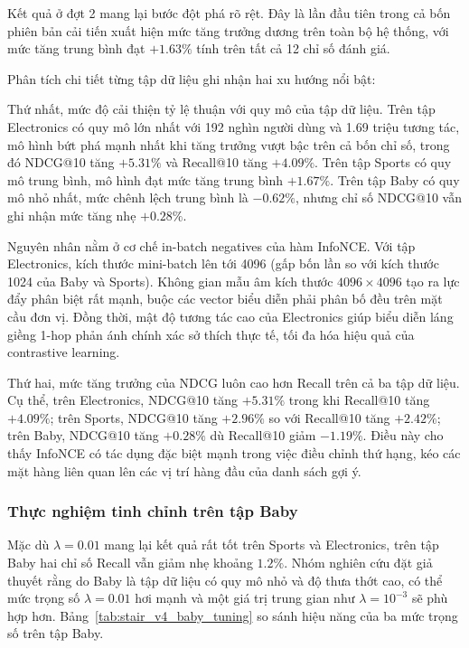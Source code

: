 Kết quả ở đợt 2 mang lại bước đột phá rõ rệt. Đây là lần đầu tiên trong cả bốn phiên bản cải tiến xuất hiện mức tăng trưởng dương trên toàn bộ hệ thống, với mức tăng trung bình đạt $+1.63\%$ tính trên tất cả 12 chỉ số đánh giá.

Phân tích chi tiết từng tập dữ liệu ghi nhận hai xu hướng nổi bật:

Thứ nhất, mức độ cải thiện tỷ lệ thuận với quy mô của tập dữ liệu. Trên tập Electronics có quy mô lớn nhất với 192 nghìn người dùng và 1.69 triệu tương tác, mô hình bứt phá mạnh nhất khi tăng trưởng vượt bậc trên cả bốn chỉ số, trong đó NDCG@10 tăng $+5.31\%$ và Recall@10 tăng $+4.09\%$. Trên tập Sports có quy mô trung bình, mô hình đạt mức tăng trung bình $+1.67\%$. Trên tập Baby có quy mô nhỏ nhất, mức chênh lệch trung bình là $-0.62\%$, nhưng chỉ số NDCG@10 vẫn ghi nhận mức tăng nhẹ $+0.28\%$. 

Nguyên nhân nằm ở cơ chế in-batch negatives của hàm InfoNCE. Với tập Electronics, kích thước mini-batch lên tới 4096 (gấp bốn lần so với kích thước 1024 của Baby và Sports). Không gian mẫu âm kích thước $4096 \times 4096$ tạo ra lực đẩy phân biệt rất mạnh, buộc các vector biểu diễn phải phân bố đều trên mặt cầu đơn vị. Đồng thời, mật độ tương tác cao của Electronics giúp biểu diễn láng giềng 1-hop phản ánh chính xác sở thích thực tế, tối đa hóa hiệu quả của contrastive learning.

Thứ hai, mức tăng trưởng của NDCG luôn cao hơn Recall trên cả ba tập dữ liệu. Cụ thể, trên Electronics, NDCG@10 tăng $+5.31\%$ trong khi Recall@10 tăng $+4.09\%$; trên Sports, NDCG@10 tăng $+2.96\%$ so với Recall@10 tăng $+2.42\%$; trên Baby, NDCG@10 tăng $+0.28\%$ dù Recall@10 giảm $-1.19\%$. Điều này cho thấy InfoNCE có tác dụng đặc biệt mạnh trong việc điều chỉnh thứ hạng, kéo các mặt hàng liên quan lên các vị trí hàng đầu của danh sách gợi ý.

\subsubsection{Thực nghiệm tinh chỉnh trên tập Baby}

Mặc dù $\lambda = 0.01$ mang lại kết quả rất tốt trên Sports và Electronics, trên tập Baby hai chỉ số Recall vẫn giảm nhẹ khoảng $1.2\%$. Nhóm nghiên cứu đặt giả thuyết rằng do Baby là tập dữ liệu có quy mô nhỏ và độ thưa thớt cao, có thể mức trọng số $\lambda = 0.01$ hơi mạnh và một giá trị trung gian như $\lambda = 10^{-3}$ sẽ phù hợp hơn. Bảng~\ref{tab:stair_v4_baby_tuning} so sánh hiệu năng của ba mức trọng số trên tập Baby.

